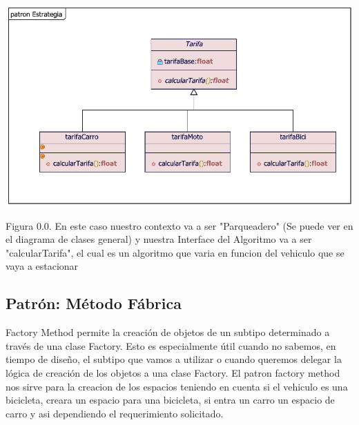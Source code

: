 \begin{center}
{\includegraphics[width=1.15\linewidth]{imgs/DiagramaClase/Strategy}}
\end{center}
\begin{center}
	Figura 0.0. En este caso nuestro contexto va a ser "Parqueadero" (Se puede ver en el diagrama de clases general) y nuestra Interface del Algoritmo va a ser "calcularTarifa", el cual es un algoritmo que varia en funcion del vehiculo que se vaya a estacionar
\end{center}
\newpage

\subsection{Patrón: Método Fábrica}
\begin{flushleft}
	Factory Method permite la creación de objetos de un subtipo determinado a través de una clase Factory. Esto es especialmente útil cuando no sabemos, en tiempo de diseño, el subtipo que vamos a utilizar o cuando queremos delegar la lógica de creación de los objetos a una clase Factory. 
	El patron factory method nos sirve para la creacion de los espacios teniendo en cuenta si el vehiculo es una bicicleta, creara un espacio para una bicicleta, si entra un carro un espacio de carro y asi dependiendo el requerimiento solicitado.
	\\
	
\end{flushleft}

